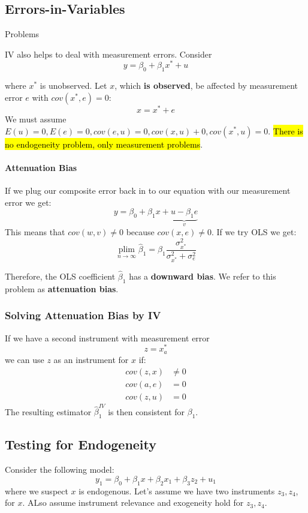 \documentclass[11pt]{article}
\begin{document}
\subsection{Errors-in-Variables} Problems

IV also helps to deal with measurement errors. Consider
\[y = \beta_0 + \beta_1 x^* + u\]

where $x^*$ is unobserved. Let $x$, which \textbf{is observed}, be affected by measurement error $e$ with $cov(x^*,e)=0$:
\[x = x^* + e\]
We must assume $E(u)=0, E(e)=0, cov(e,u)=0, cov(x,u)+0, cov(x^*,u)=0$. \hl{There is no endogeneity problem, only measurement problems}.

\paragraph{Attenuation Bias} \mbox{}

If we plug our composite error back in to our equation with our measurement error we get:
\[y = \beta_0 + \beta_1 x + \underset{v}{\underbrace{u - \beta_1 e}}\]
This means that $cov(w,v)\neq0$ because $cov(x,e)\neq0$. If we try OLS we get:
\begin{equation}
\underset{n \rightarrow \infty}{\operatorname{plim}} \hat{\beta}_1=\beta_1 \frac{\sigma_{x^*}^2}{\sigma_{x^*}^2+\sigma_e^2}
\end{equation}

Therefore, the OLS coefficient $\hat{\beta}_1$ has a \textbf{downward bias}. We refer to this problem as \textbf{attenuation bias}.

\subsubsection{Solving Attenuation Bias by IV}

If we have a second instrument with measurement error
\[z = x^* _ a\]
we can use $z$ as an instrument for $x$ if:
\begin{align*}
    cov(z,x)&\neq0 \\
    cov(a,e)&= 0 \\
    cov(z,u)&=0
\end{align*}
The resulting estimator $\hat{\beta}_1^{IV}$ is then consistent for $\beta_1$.

\subsection{Testing for Endogeneity}

Consider the following model:
\[y_1 = \beta_0 + \beta_1 x + \beta_2 x_1 + \beta_3 z_2 + u_1\]
where we suspect $x$ is endogenous. Let's assume we have two instruments $z_3,z_4$, for $x$. ALso assume instrument relevance and exogeneity hold for $z_3,z_4$.
\end{document}
